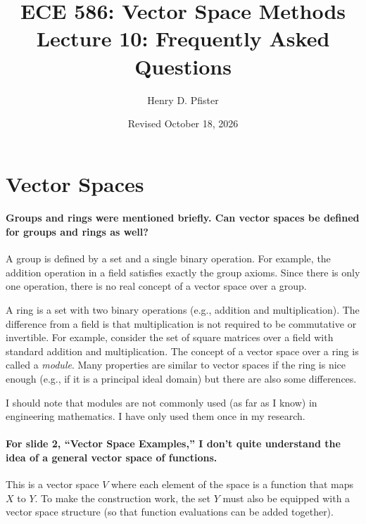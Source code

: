 \documentclass[10pt,english]{article}
\begin{document}
\title{ECE 586: Vector Space Methods \\ Lecture 10: Frequently Asked Questions}
\author{Henry D. Pfister \\ \univ}
\date{Revised October 18, 2026}

\maketitle

\section{Vector Spaces}

\paragraph{Groups and rings were mentioned briefly. Can vector spaces be defined for groups and rings as well?}

A group is defined by a set and a single binary operation.
For example, the addition operation in a field satisfies exactly the group axioms.
Since there is only one operation, there is no real concept of a vector space over a group.

A ring is a set with two binary operations (e.g., addition and multiplication).
The difference from a field is that multiplication is not required to be commutative or invertible.
For example, consider the set of square matrices over a field with standard addition and multiplication.
The concept of a vector space over a ring is called a \emph{module}.
Many properties are similar to vector spaces if the ring is nice enough (e.g., if it is a principal ideal domain) but there are also some differences.

I should note that modules are not commonly used (as far as I know) in engineering mathematics.
I have only used them once in my research.

\paragraph{For slide 2, ``Vector Space Examples,'' I don't quite understand the idea of a general vector space of functions.}

This is a vector space $V$ where each element of the space is a function that maps $X$ to $Y$.
To make the construction work, the set $Y$ must also be equipped with a vector space structure (so that function evaluations can be added together).
\end{document}
